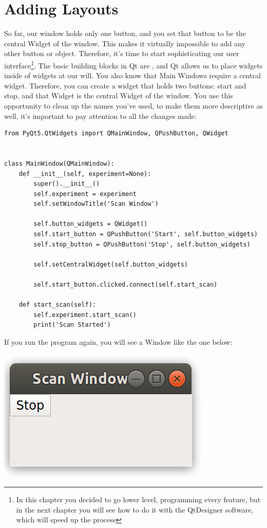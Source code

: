 \section{Adding Layouts}\label{sec:adding-layouts}
So far, our window holds only one button, and you set that button to be the central Widget of the window. This makes it virtually impossible to add any other button or object. Therefore, it's time to start sophisticating our user interface\footnote{In this chapter you decided to go lower level, programming every feature, but in the next chapter you will see how to do it with the QtDesigner software, which will speed up the process}. The basic building blocks in Qt are , and Qt allows us to place widgets inside of widgets at our will. You also know that Main Windows require a central widget. Therefore, you can create a widget that holds two buttons: start and stop, and that Widget is the central Widget of the window. You use this opportunity to clean up the names you've used, to make them more descriptive as well, it's important to pay attention to all the changes made:

\begin{verbatim}
from PyQt5.QtWidgets import QMainWindow, QPushButton, QWidget


class MainWindow(QMainWindow):
    def __init__(self, experiment=None):
        super().__init__()
        self.experiment = experiment
        self.setWindowTitle('Scan Window')

        self.button_widgets = QWidget()
        self.start_button = QPushButton('Start', self.button_widgets)
        self.stop_button = QPushButton('Stop', self.button_widgets)

        self.setCentralWidget(self.button_widgets)

        self.start_button.clicked.connect(self.start_scan)

    def start_scan(self):
        self.experiment.start_scan()
        print('Scan Started')
\end{verbatim}

If you run the program again, you will see a Window like the one below:

\begin{center}
    \includegraphics[width=.3\textwidth]{images/Chapter_08/05_window_without_layout.png}
\end{center}

